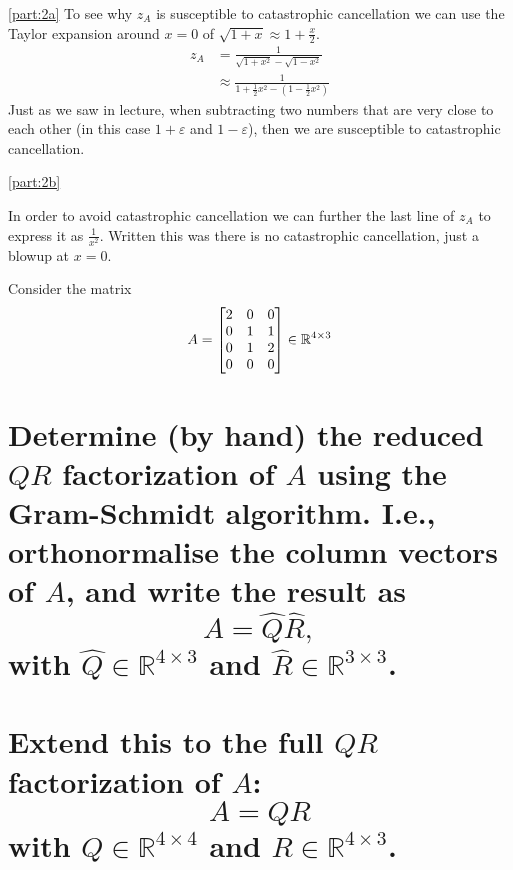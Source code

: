 \documentclass[boxes,pages]{homework}
\begin{document}
\begin{solution}
	\ref{part:2a}
	To see why $z_A$ is susceptible to catastrophic cancellation we can use the Taylor expansion around $x = 0$ of $\sqrt{1 + x} \approx 1 + \frac{x}{2}$.
	\begin{align*}
		z_A & = \frac{1}{\sqrt{1 + x^2} - \sqrt{1 - x^2}}                 \\
		    & \approx \frac{1}{1 + \frac{1}{2}x^2 - (1 - \frac{1}{2}x^2)}
	\end{align*}
	Just as we saw in lecture, when subtracting two numbers that are very close to each other (in this case $1 + \varepsilon$ and $1 - \varepsilon$), then we are susceptible to catastrophic cancellation.

	\ref{part:2b}

	In order to avoid catastrophic cancellation we can further the last line of $z_A$ to express it as $\frac{1}{x^2}$. Written this was there is no catastrophic cancellation, just a blowup at $x = 0$.
\end{solution}

\begin{problem}
Consider the matrix
\[
	A = \mqty[2 & 0 & 0 \\ 0 & 1 & 1 \\ 0 & 1 & 2 \\ 0 & 0 & 0]\in\mathbb{R}^{4\times 3}
\]
\begin{parts}
	\part{Determine (by hand) the reduced $QR$ factorization of $A$ using the Gram-Schmidt algorithm. I.e., orthonormalise the column vectors of $A$, and write the result as \[A = \widehat{Q}\widehat{R},\] with $\widehat{Q}\in\mathbb{R}^{4\times 3}$ and $\widehat{R}\in\mathbb{R}^{3\times 3}$.}\label{part:3a}
	\part{Extend this to the full $QR$ factorization of $A$:\[ A = QR \] with $Q\in\mathbb{R}^{4\times 4}$ and $R\in\mathbb{R}^{4\times 3}$.}\label{part:3b}
\end{parts}
\end{problem}
\end{document}
